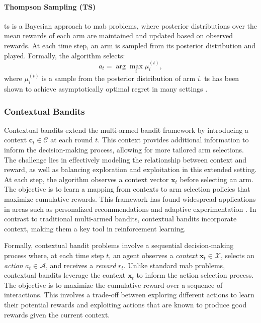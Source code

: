 \paragraph{Thompson Sampling (TS)}
\acf{ts} is a Bayesian approach to \ac{mab} problems, where posterior distributions over the mean rewards of each arm are maintained and updated based on observed rewards. At each time step, an arm is sampled from its posterior distribution and played. Formally, the algorithm selects:
\begin{equation}
    a_t = \arg \max_i \mu_i^{(t)},
\end{equation}
where $\mu_i^{(t)}$ is a sample from the posterior distribution of arm $i$. \ac{ts} has been shown to achieve asymptotically optimal regret in many settings \citep{agrawal2012analysis}.

\subsubsection{Contextual Bandits}
Contextual bandits extend the multi-armed bandit framework by introducing a context $\mathbf{c}_t \in \mathcal{C}$ at each round $t$. This context provides additional information to inform the decision-making process, allowing for more tailored arm selections. The challenge lies in effectively modeling the relationship between context and reward, as well as balancing exploration and exploitation in this extended setting. At each step, the algorithm observes a context vector $\mathbf{x}_t$ before selecting an arm. The objective is to learn a mapping from contexts to arm selection policies that maximize cumulative rewards. This framework has found widespread applications in areas such as personalized recommendations and adaptive experimentation \citep{li2010contextual}. In contrast to traditional multi-armed bandits, contextual bandits incorporate context, making them a key tool in reinforcement learning.
 
Formally, contextual bandit problems involve a sequential decision-making process where, at each time step $t$, an agent observes a \textit{context} $\mathbf{x}_t \in \mathcal{X}$, selects an \textit{action} $a_t \in \mathcal{A}$, and receives a \textit{reward} $r_t$. Unlike standard \ac{mab} problems, contextual bandits leverage the context $\mathbf{x}_t$ to inform the action selection process. The objective is to maximize the cumulative reward over a sequence of interactions. This involves a trade-off between exploring different actions to learn their potential rewards and exploiting actions that are known to produce good rewards given the current context.


